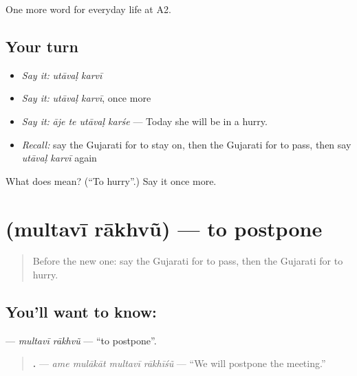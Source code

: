 \begin{grammarlens}[title={What you've built}]
One more word for everyday life at A2.
\end{grammarlens}

\subsection*{Your turn}
\begin{itemize}
\raggedright
  \item \emph{Say it:} \emph{utāvaḷ karvī}
  \item \emph{Say it:} \emph{utāvaḷ karvī}, once more
  \item \emph{Say it:} \emph{āje te utāvaḷ karśe} — Today she will be in a hurry.
  \item \emph{Recall:} say the Gujarati for to stay on, then the Gujarati for to pass, then say \emph{utāvaḷ karvī} again
\end{itemize}

\begin{tcolorbox}[breakable,colback=teal!4,colframe=teal!35!black,title={Before you move on}]
What does   mean? (\textquotedblleft{}To hurry\textquotedblright{}.) Say it once more.
\end{tcolorbox}
\section[\texorpdfstring{\gu{મુલતવી} \gu{રાખવું} (multavī rākhvũ)}{મુલતવી રાખવું (multavī rākhvũ)}]{  (multavī rākhvũ) — to postpone}

\label{lesson:GU-C181-multavi-rakhvu}



\begin{quote}
Before the new one: say the Gujarati for to pass, then the Gujarati for to hurry.
\end{quote}

\subsection*{You'll want to know:  }
\textbf{ } — \emph{multavī rākhvũ} — \textquotedblleft{}to postpone\textquotedblright{}.

\begin{quote}
\textbf{   .} — \emph{ame mulākāt multavī rākhīśũ} — \textquotedblleft{}We will postpone the meeting.\textquotedblright{}
\end{quote}

